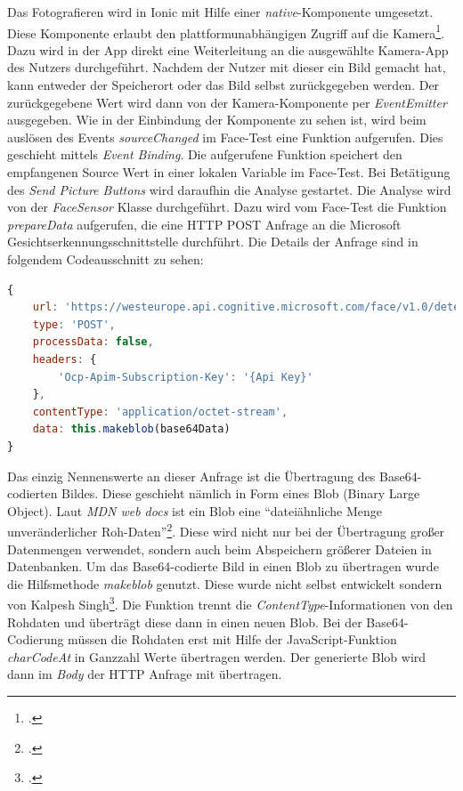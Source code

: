 Das Fotografieren wird in Ionic mit Hilfe einer \textit{native}-Komponente umgesetzt. Diese Komponente erlaubt den plattformunabhängigen Zugriff auf die Kamera\footcite{Ion18e}. Dazu wird in der App direkt eine Weiterleitung an die ausgewählte Kamera-App des Nutzers durchgeführt. Nachdem der Nutzer mit dieser ein Bild gemacht hat, kann entweder der Speicherort oder das Bild selbst zurückgegeben werden. Der zurückgegebene Wert wird dann von der Kamera-Komponente per \textit{EventEmitter} ausgegeben.\newline
Wie in der Einbindung der Komponente zu sehen ist, wird beim auslösen des Events \textit{sourceChanged} im Face-Test eine Funktion aufgerufen. Dies geschieht mittels \textit{Event Binding}. Die aufgerufene Funktion speichert den empfangenen Source Wert in einer lokalen Variable im Face-Test. Bei Betätigung des \textit{Send Picture Buttons} wird daraufhin die Analyse gestartet. Die Analyse wird von der \textit{FaceSensor} Klasse durchgeführt. Dazu wird vom Face-Test die Funktion \textit{prepareData} aufgerufen, die eine HTTP POST Anfrage an die Microsoft Gesichtserkennungsschnittstelle durchführt. Die Details der Anfrage sind in folgendem Codeausschnitt zu sehen: \newline
\begin{lstlisting}[caption={Aufbau Anfrage an Gesichtserkennungsschnittstelle}, language=JavaScript]
{
	url: 'https://westeurope.api.cognitive.microsoft.com/face/v1.0/detect?returnFaceAttributes=emotion',
	type: 'POST',
	processData: false,
	headers: {
		'Ocp-Apim-Subscription-Key': '{Api Key}'
	},
	contentType: 'application/octet-stream',
	data: this.makeblob(base64Data)
}
\end{lstlisting}
Das einzig Nennenswerte an dieser Anfrage ist die Übertragung des Base64-codierten Bildes. Diese geschieht nämlich in Form eines Blob (Binary Large Object). Laut \textit{MDN web docs} ist ein Blob eine ``dateiähnliche Menge unveränderlicher Roh-Daten''\footcite[Vgl. ][Abschnitt Übersicht]{Mdn18}. Diese wird nicht nur bei der Übertragung großer Datenmengen verwendet, sondern auch beim Abspeichern größerer Dateien in Datenbanken. Um das Base64-codierte Bild in einen Blob zu übertragen wurde die Hilfsmethode \textit{makeblob} genutzt. Diese wurde nicht selbst entwickelt sondern von Kalpesh Singh\footcite[Vgl. ][Antwort von Kalpesh Singh]{Sin16}. Die Funktion trennt die \textit{ContentType}-Informationen von den Rohdaten und überträgt diese dann in einen neuen Blob. Bei der Base64-Codierung müssen die Rohdaten erst mit Hilfe der JavaScript-Funktion \textit{charCodeAt} in Ganzzahl Werte übertragen werden. Der generierte Blob wird dann im \textit{Body} der HTTP Anfrage mit übertragen.\newline
